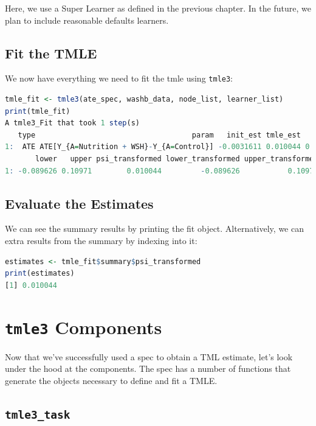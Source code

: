 \documentclass[12pt, krantz2,]{krantz}
\newcommand{\passthrough}[1]{#1}
\theoremstyle{definition}
\theoremstyle{definition}
\theoremstyle{definition}
\newcommand{\1}{\mathbbm{1}}
\begin{document}
Here, we use a Super Learner as defined in the previous chapter. In the future,
we plan to include reasonable defaults learners.

\hypertarget{fit-the-tmle}{%
\subsection{Fit the TMLE}\label{fit-the-tmle}}

We now have everything we need to fit the tmle using \passthrough{\lstinline!tmle3!}:

\begin{lstlisting}[language=R]
tmle_fit <- tmle3(ate_spec, washb_data, node_list, learner_list)
print(tmle_fit)
A tmle3_Fit that took 1 step(s)
   type                                    param   init_est tmle_est       se
1:  ATE ATE[Y_{A=Nutrition + WSH}-Y_{A=Control}] -0.0031611 0.010044 0.050853
       lower   upper psi_transformed lower_transformed upper_transformed
1: -0.089626 0.10971        0.010044         -0.089626           0.10971
\end{lstlisting}

\hypertarget{evaluate-the-estimates}{%
\subsection{Evaluate the Estimates}\label{evaluate-the-estimates}}

We can see the summary results by printing the fit object. Alternatively, we
can extra results from the summary by indexing into it:

\begin{lstlisting}[language=R]
estimates <- tmle_fit$summary$psi_transformed
print(estimates)
[1] 0.010044
\end{lstlisting}

\hypertarget{tmle3-components}{%
\section{\texorpdfstring{\texttt{tmle3} Components}{tmle3 Components}}\label{tmle3-components}}

Now that we've successfully used a spec to obtain a TML estimate, let's look
under the hood at the components. The spec has a number of functions that
generate the objects necessary to define and fit a TMLE.

\hypertarget{tmle3_task}{%
\subsection{\texorpdfstring{\texttt{tmle3\_task}}{tmle3\_task}}\label{tmle3_task}}
\end{document}
